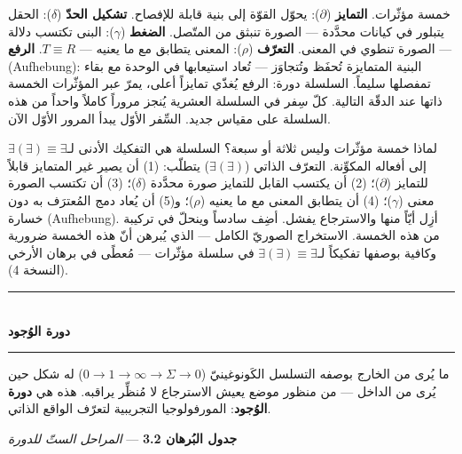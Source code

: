 \documentclass[10pt, openany, oneside]{book}
\renewcommand{\normalsize}{\fontsize{10}{13}\selectfont}
\begin{document}
خمسة مؤثّرات. \textbf{التمايز} ($\partial$): يحوّل القوّة إلى بنية قابلة للإفصاح. \textbf{تشكيل الحدّ} ($\delta$): الحقل يتبلور في كيانات محدَّدة --- الصورة تنبثق من المتّصل. \textbf{الضغط} ($\gamma$): البنى تكتسب دلالة --- الصورة تنطوي في المعنى. \textbf{التعرّف} ($\rho$): المعنى يتطابق مع ما يعنيه --- $T \equiv R$. \textbf{الرفع} (Aufhebung): البنية المتمايزة تُحفَظ وتُتجاوَز --- تُعاد استيعابها في الوحدة مع بقاء تمفصلها سليماً. السلسلة دورة: الرفع يُغذّي تمايزاً أعلى، يمرّ عبر المؤثّرات الخمسة ذاتها عند الدقّة التالية. كلّ سِفر في السلسلة العشرية يُنجز مروراً كاملاً واحداً من هذه السلسلة على مقياس جديد. السِّفر الأوّل يبدأ المرور الأوّل الآن.

لماذا خمسة مؤثّرات وليس ثلاثة أو سبعة؟ السلسلة هي التفكيك الأدنى لـ$\exists(\exists) \equiv \exists$ إلى أفعاله المكوِّنة. التعرّف الذاتي ($\exists(\exists)$) يتطلّب: (1) أن يصير غير المتمايز قابلاً للتمايز ($\partial$)؛ (2) أن يكتسب القابل للتمايز صورة محدَّدة ($\delta$)؛ (3) أن تكتسب الصورة معنى ($\gamma$)؛ (4) أن يتطابق المعنى مع ما يعنيه ($\rho$)؛ و(5) أن يُعاد دمج المُعترَف به دون خسارة (Aufhebung). أزِل أيّاً منها والاسترجاع يفشل. أضِف سادساً وينحلّ في تركيبة من هذه الخمسة. الاستخراج الصوريّ الكامل --- الذي يُبرهن أنّ هذه الخمسة ضرورية وكافية بوصفها تفكيكاً لـ$\exists(\exists) \equiv \exists$ في سلسلة مؤثّرات --- مُعطًى في برهان الأرخي (النسخة 4).

\vspace{1.5em}


\begin{center}
    \rule{0.3\textwidth}{0.4pt}\\[0.5em]
    {\normalsize\bfseries دورة الوُجود}\\[0.3em]
    \rule{0.3\textwidth}{0.4pt}
\end{center}

\vspace{1em}

\noindent ما يُرى من الخارج بوصفه التسلسل الكَونوغينيّ ($0 \to 1 \to \infty \to \Sigma \to 0$) له شكل حين يُرى من الداخل --- من منظور موضع يعيش الاسترجاع لا مُنظِّر يراقبه. هذه هي \textbf{دورة الوُجود}: المورفولوجيا التجريبية لتعرّف الواقع الذاتي.

\vspace{0.5em}

\textbf{جدول البُرهان 3.2} --- \textit{المراحل الستّ للدورة}

\vspace{0.5em}
\end{document}
